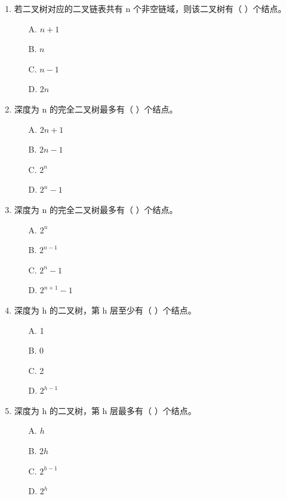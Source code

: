 \documentclass[12pt, a4paper]{article}
\begin{document}
\begin{enumerate}[label=\arabic*.]
	\item 若二叉树对应的二叉链表共有 n 个非空链域，则该二叉树有（ ）个结点。
	      \begin{enumerate}
		      \item[A.] $n+1$
		      \item[B.] $n$
		      \item[C.] $n-1$
		      \item[D.] $2n$
	      \end{enumerate}

	\item 深度为 n 的完全二叉树最多有（ ）个结点。
	      \begin{enumerate}
		      \item[A.] $2n+1$
		      \item[B.] $2n-1$
		      \item[C.] $2^n$
		      \item[D.] $2^n-1$
	      \end{enumerate}

	\item 深度为 n 的完全二叉树最多有（ ）个结点。
	      \begin{enumerate}
		      \item[A.] $2^n$
		      \item[B.] $2^{n-1}$
		      \item[C.] $2^n-1$
		      \item[D.] $2^{n+1}-1$
	      \end{enumerate}

	\item 深度为 h 的二叉树，第 h 层至少有（ ）个结点。
	      \begin{enumerate}
		      \item[A.] 1
		      \item[B.] 0
		      \item[C.] 2
		      \item[D.] $2^{h-1}$
	      \end{enumerate}

	\item 深度为 h 的二叉树，第 h 层最多有（ ）个结点。
	      \begin{enumerate}
		      \item[A.] $h$
		      \item[B.] $2h$
		      \item[C.] $2^{h-1}$
		      \item[D.] $2^h$
	      \end{enumerate}


\end{enumerate}
\end{document}
